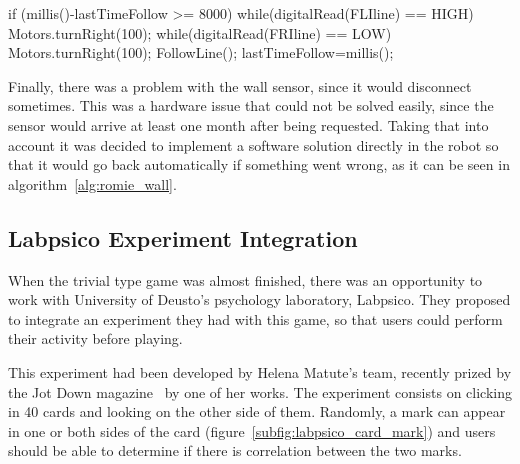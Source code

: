 \begin{center}
\begin{minipage}{.9\textwidth}
\singlespace
{}
\begin{pyglist}[language=c, caption={Arduino code for returning if wall was hit.},
	label={alg:romie_wall}, listingname={Algorithm}, numbers=left]
if (millis()-lastTimeFollow >= 8000) {
    while(digitalRead(FLIline) == HIGH) Motors.turnRight(100);
    while(digitalRead(FRIline) == LOW) Motors.turnRight(100);
    FollowLine();
    lastTimeFollow=millis();
}
\end{pyglist}
\end{minipage}
\end{center}

Finally, there was a problem with the wall sensor, since it would disconnect sometimes. This was a
hardware issue that could not be solved easily, since the sensor would arrive at least one month
after being requested. Taking that into account it was decided to implement a software solution
directly in the robot so that it would go back automatically if something went wrong, as it can be
seen in algorithm~\ref{alg:romie_wall}.

\subsection{Labpsico Experiment Integration}

When the trivial type game was almost finished, there was an opportunity to work with University of
Deusto's psychology laboratory, Labpsico. They proposed to integrate an experiment they had with
this game, so that users could perform their activity before playing.

This experiment had been developed by Helena Matute's team, recently prized by the Jot Down
magazine~\cite{jotdown_helena} by one of her works. The experiment consists on clicking in 40 cards
and looking on the other side of them. Randomly, a mark can appear in one or both sides of the card
(figure~\ref{subfig:labpsico_card_mark}) and users should be able to determine if there is
correlation between the two marks.

